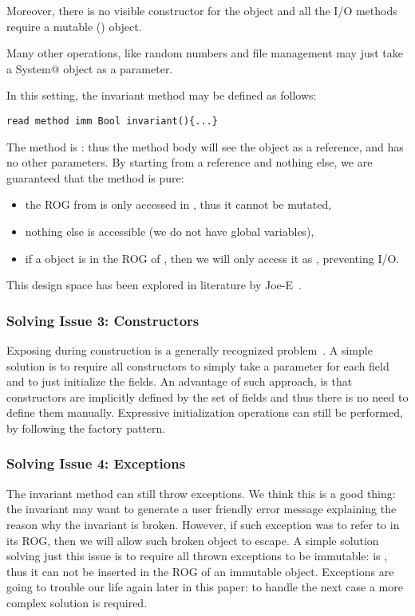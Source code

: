 Moreover, there is no visible constructor for the \Q@System@ object and all the I/O methods require a mutable (\Q@mut@) object.

Many other operations, like random numbers and file management may just take a \Q@mut System@ object as a parameter.

In this setting, the invariant method may be defined as follows:
\saveSpace
\begin{lstlisting}
read method imm Bool invariant(){...}
\end{lstlisting}
\saveSpace
The method is \Q@read@: thus the method body will see the \Q@this@ object as a \Q@read@ reference, and has no other parameters.
By starting from a \Q@read@ reference and nothing else, we are guaranteed that the method is pure:
\begin{itemize}
\item the ROG from \Q@this@ is only accessed in \Q@read@, thus it cannot be mutated,
\item nothing else is accessible (we do not have global variables),
\item if a \Q@System@ object is in the ROG of \Q@this@, then we will only access it as \Q@read@, preventing I/O.
\end{itemize}
\noindent This design space has been explored in literature by Joe-E~\cite{finifter2008verifiable}.
\saveSpace

\subsubsection*{Solving Issue 3: Constructors}
\saveSpace
Exposing \Q@this@ during construction is a generally recognized problem~\cite{gil2009we}.
A simple solution is to require all constructors to 
simply take a parameter for each field and to just initialize the fields.
An advantage of such approach, is that constructors are implicitly defined
by the set of fields and thus there is no need to define them manually.
Expressive initialization operations can still be performed, by following the factory pattern.
\saveSpace
\subsubsection*{Solving Issue 4: Exceptions}
\saveSpace
The invariant method can still throw exceptions.
We think this is a good thing: the invariant may want to generate a user friendly error message explaining the reason why the invariant is broken.
However, if such exception was to refer to \Q@this@ in its ROG, then we will allow such broken object to escape.
A simple solution solving just this issue is to require all thrown exceptions to be immutable:
\Q@this@ is \Q@read@, thus it can not be inserted in the ROG of an immutable object.
Exceptions are going to trouble our life again later in this paper:
to handle the next case a more complex solution is required.




